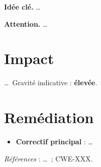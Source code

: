 \documentclass[11pt,a4paper]{article}
\begin{document}
\begin{keybox}
\textbf{Idée clé.} \dots
\end{keybox}

\begin{warnbox}
\textbf{Attention.} \dots
\end{warnbox}

\section{Impact}
\dots\ Gravité indicative : \textbf{élevée}.

\section{Remédiation}
\begin{itemize}
  \item \textbf{Correctif principal} : \dots
\end{itemize}

\vspace{4pt}
\noindent\emph{Références} : \dots\ ; CWE-XXX.
\end{document}
